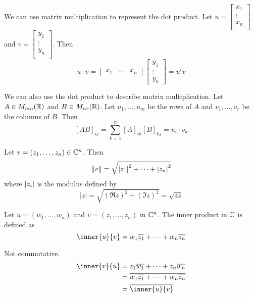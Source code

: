 \documentclass{article}
\begin{document}
\begin{corollary}
  We can use matrix multiplication to represent the dot product. Let $u =
    \begin{bmatrix}
      x_1    \\
      \vdots \\
      x_n    \\
    \end{bmatrix}$ and $v =
    \begin{bmatrix}
      y_1    \\
      \vdots \\
      y_n    \\
    \end{bmatrix}$. Then \[
    u \cdot v =
    \begin{bmatrix}
      x_1 & \dots & x_n
    \end{bmatrix}
    \begin{bmatrix}
      y_1 \\\vdots\\y_n
    \end{bmatrix} = u^tv
  \]

  We can also use the dot product to describe matrix multiplication. Let $A \in M_{mn}(\mathbb{R})$ and $B \in M_{nr}(\mathbb{R})$. Let $u_1, \ldots, u_m$ be the rows of $A$ and $v_1, \ldots, v_r$ be the columns of $B$.
  Then \[
    [AB]_{ij} = \sum_{k=1}^n [A]_{ik}[B]_{kj} = u_i \cdot v_k
  \]
\end{corollary}
\begin{definition}
  Let $v = (z_1, \ldots, z_n) \in \mathbb{C}^n$. Then \[
    \norm{v} = \sqrt{\abs{z_1}^2 + \dots + \abs{z_n}^2}
  \] where $\abs{z_i}$ is the modulus defined by \[
    |z| = \sqrt{(\Re z)^2 + (\Im z)^2} = \sqrt{z\overline{z}}
  \]
\end{definition}
\begin{definition}
  Let $u = (w_1, \ldots, w_n)$ and $v = (z_1, \ldots, z_n)$ in $\mathbb{C}^n$. The inner product in $\mathbb{C}$ is defined as \[
    \inner{u}{v} =  w_1\overline{z_1} + \dots + w_n\overline{z_n}
  \]
\end{definition}
\begin{corollary}
  Not commutative.
  \begin{align*}
    \inner{v}{u} & = z_1\overline{w_1} + \dots + z_n\overline{w_n}            \\
                 & = \overline{w_1\overline{z_1} + \dots + w_n\overline{z_n}} \\
                 & = \overline{\inner{u}{v}}
  \end{align*}
\end{corollary}
\end{document}

